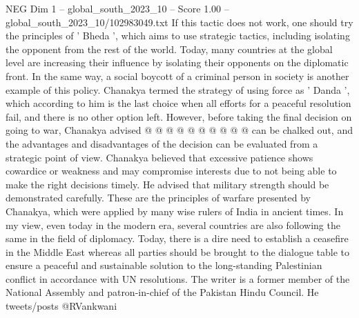 \begin{textsample}{NEG Dim 1 – global\_south\_2023\_10 – Score 1.00 – global\_south\_2023\_10/102983049.txt}
If this tactic does not work, one should try the principles of ' Bheda ', which aims to use strategic tactics, including isolating the opponent from the rest of the world.
Today, many countries at the global level are increasing their influence by isolating their opponents on the diplomatic front.
In the same way, a social boycott of a criminal person in society is another example of this policy.
Chanakya termed the strategy of using force as ' Danda ', which according to him is the last choice when all efforts for a peaceful resolution fail, and there is no other option left.
However, before taking the final decision on going to war, Chanakya advised @ @ @ @ @ @ @ @ @ @ can be chalked out, and the advantages and disadvantages of the decision can be evaluated from a strategic point of view.
Chanakya believed that excessive patience shows cowardice or weakness and may compromise interests due to not being able to make the right decisions timely.
He advised that military strength should be demonstrated carefully.
These are the principles of warfare presented by Chanakya, which were applied by many wise rulers of India in ancient times.
In my view, even today in the modern era, several countries are also following the same in the field of diplomacy.
Today, there is a dire need to establish a ceasefire in the Middle East whereas all parties should be brought to the dialogue table to ensure a peaceful and sustainable solution to the long-standing Palestinian conflict in accordance with UN resolutions.
The writer is a former member of the National Assembly and patron-in-chief of the Pakistan Hindu Council.
He tweets/posts @RVankwani

\end{textsample}
